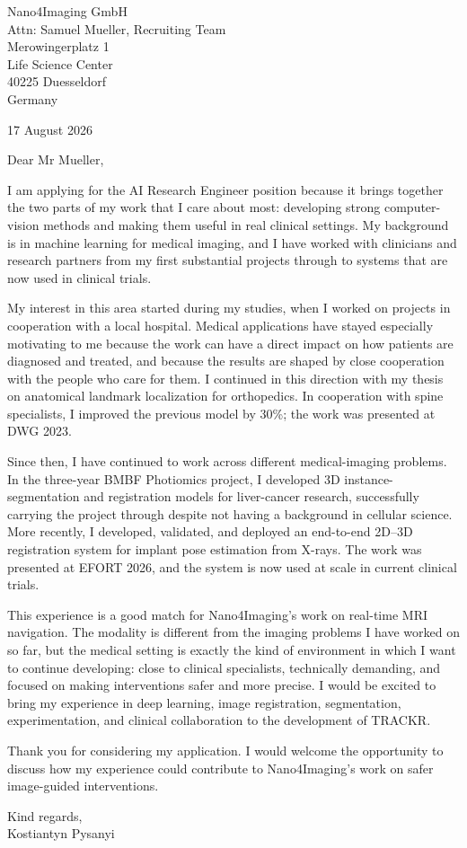 \documentclass[11pt,a4paper]{article}
\begin{document}
Nano4Imaging GmbH\\
Attn: Samuel Mueller, Recruiting Team\\
Merowingerplatz 1\\
Life Science Center\\
40225 Duesseldorf\\
Germany

\begin{flushright}
17 August 2026
\end{flushright}

Dear Mr Mueller,

I am applying for the AI Research Engineer position because it brings together the two parts of my work that I care about most: developing strong computer-vision methods and making them useful in real clinical settings. My background is in machine learning for medical imaging, and I have worked with clinicians and research partners from my first substantial projects through to systems that are now used in clinical trials.

My interest in this area started during my studies, when I worked on projects in cooperation with a local hospital. Medical applications have stayed especially motivating to me because the work can have a direct impact on how patients are diagnosed and treated, and because the results are shaped by close cooperation with the people who care for them. I continued in this direction with my thesis on anatomical landmark localization for orthopedics. In cooperation with spine specialists, I improved the previous model by 30\%; the work was presented at DWG 2023.

Since then, I have continued to work across different medical-imaging problems. In the three-year BMBF Photiomics project, I developed 3D instance-segmentation and registration models for liver-cancer research, successfully carrying the project through despite not having a background in cellular science. More recently, I developed, validated, and deployed an end-to-end 2D--3D registration system for implant pose estimation from X-rays. The work was presented at EFORT 2026, and the system is now used at scale in current clinical trials.

This experience is a good match for Nano4Imaging's work on real-time MRI navigation. The modality is different from the imaging problems I have worked on so far, but the medical setting is exactly the kind of environment in which I want to continue developing: close to clinical specialists, technically demanding, and focused on making interventions safer and more precise. I would be excited to bring my experience in deep learning, image registration, segmentation, experimentation, and clinical collaboration to the development of TRACKR.

Thank you for considering my application. I would welcome the opportunity to discuss how my experience could contribute to Nano4Imaging's work on safer image-guided interventions.

Kind regards,\\
Kostiantyn Pysanyi
\end{document}
